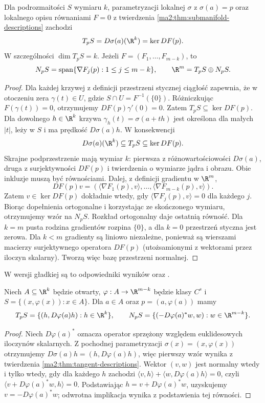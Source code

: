 \begin{twierdzenie}
\label{ma2:thm:tangent-descriptions}
Dla podrozmaitości $S$ wymiaru $k$, parametryzacji
lokalnej $\sigma$ z $\sigma(a)=p$ oraz lokalnego
opisu równaniami $F=0$ z twierdzenia
\ref{ma2:thm:submanifold-descriptions} zachodzi
\[
 T_pS=D\sigma(a)(\R^k)=\ker DF(p).
\]
W szczególności $\dim T_pS=k$. Jeżeli
$F=(F_1,\ldots,F_{m-k})$, to
\[
 N_pS=\operatorname{span}\{\nabla F_j(p):1\le j\le m-k\},
 \qquad \R^m=T_pS\oplus N_pS.
\]
\end{twierdzenie}
\begin{proof}
Dla każdej krzywej z definicji przestrzeni stycznej
ciągłość zapewnia, że w otoczeniu zera $\gamma(t)\in U$,
gdzie $S\cap U=F^{-1}(\{0\})$. Różniczkując
$F(\gamma(t))=0$, otrzymujemy $DF(p)\gamma'(0)=0$.
Zatem $T_pS\subseteq\ker DF(p)$.
Dla dowolnego $h\in\R^k$ krzywa
$\gamma_h(t)=\sigma(a+th)$ jest określona dla małych
$|t|$, leży w $S$ i ma prędkość $D\sigma(a)h$.
W konsekwencji
\[
 D\sigma(a)(\R^k)\subseteq T_pS\subseteq\ker DF(p).
\]
Skrajne podprzestrzenie mają wymiar $k$: pierwsza
z różnowartościowości $D\sigma(a)$, druga z surjektywności
$DF(p)$ i twierdzenia o wymiarze jądra i obrazu.
Obie inkluzje muszą być równościami.
Dalej, z definicji gradientu w $\R^m$,
\[
 DF(p)v=(\langle\nabla F_1(p),v\rangle,\ldots,
              \langle\nabla F_{m-k}(p),v\rangle).
\]
Zatem $v\in\ker DF(p)$ dokładnie wtedy, gdy
$\langle\nabla F_j(p),v\rangle=0$ dla każdego $j$.
Biorąc dopełnienia ortogonalne i korzystając ze
skończonego wymiaru, otrzymujemy wzór na $N_pS$.
Rozkład ortogonalny daje ostatnią równość.
Dla $k=m$ pusta rodzina gradientów rozpina $\{0\}$,
a dla $k=0$ przestrzeń styczna jest zerowa.
Dla $k<m$ gradienty są liniowo niezależne, ponieważ
są wierszami macierzy surjektywnego operatora $DF(p)$
(utożsamionymi z wektorami przez iloczyn skalarny).
Tworzą więc bazę przestrzeni normalnej.
\end{proof}

W wersji gładkiej są to odpowiedniki wyników
oraz
.

\begin{wniosek}
\label{ma2:cor:graph-tangent}
Niech $A\subseteq\R^k$ będzie otwarty,
$\varphi:A\to\R^{m-k}$ będzie klasy $C^s$ i
$S=\{(x,\varphi(x)):x\in A\}$.
Dla $a\in A$ oraz $p=(a,\varphi(a))$ mamy
\[
 T_pS=\{(h,D\varphi(a)h):h\in\R^k\},\qquad
 N_pS=\{(-D\varphi(a)^*w,w):w\in\R^{m-k}\}.
\]
\end{wniosek}
\begin{proof}
Niech $D\varphi(a)^*$ oznacza operator sprzężony
względem euklidesowych iloczynów skalarnych.
Z pochodnej parametryzacji $\sigma(x)=(x,\varphi(x))$
otrzymujemy $D\sigma(a)h=(h,D\varphi(a)h)$,
więc pierwszy wzór wynika z twierdzenia
\ref{ma2:thm:tangent-descriptions}.
Wektor $(v,w)$ jest normalny wtedy i tylko wtedy, gdy
dla każdego $h$ zachodzi
$\langle v,h\rangle+\langle w,D\varphi(a)h\rangle=0$,
czyli $\langle v+D\varphi(a)^*w,h\rangle=0$.
Podstawiając $h=v+D\varphi(a)^*w$, uzyskujemy
$v=-D\varphi(a)^*w$; odwrotna implikacja wynika
z podstawienia tej równości.
\end{proof}

